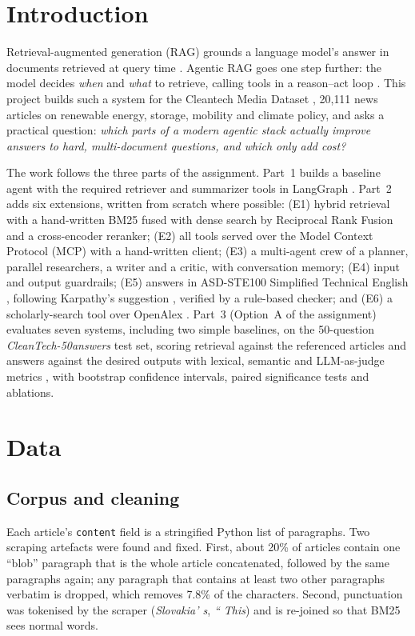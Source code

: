 \section{Introduction}
Retrieval-augmented generation (RAG) grounds a language model's answer in documents retrieved at query time
\cite{lewis2020rag}. Agentic RAG goes one step further: the model decides \emph{when} and \emph{what} to
retrieve, calling tools in a reason--act loop \cite{yao2023react}. This project builds such a system for the
Cleantech Media Dataset \cite{lipenkova2024cleantech}, 20{,}111 news articles on renewable energy,
storage, mobility and climate policy, and asks a practical question: \emph{which parts of a modern agentic
stack actually improve answers to hard, multi-document questions, and which only add cost?}

The work follows the three parts of the assignment. Part~1 builds a baseline agent with the required
retriever and summarizer tools in LangGraph \cite{langgraph}. Part~2 adds six extensions, written from
scratch where possible: (E1) hybrid retrieval with a hand-written BM25 \cite{robertson2009bm25} fused with
dense search by Reciprocal Rank Fusion \cite{cormack2009rrf} and a cross-encoder reranker; (E2) all tools
served over the Model Context Protocol (MCP) \cite{anthropic2024mcp} with a hand-written client; (E3) a
multi-agent crew of a planner, parallel researchers, a writer and a critic, with conversation memory;
(E4) input and output guardrails; (E5) answers in ASD-STE100 Simplified Technical English
\cite{asdste100}, following Karpathy's suggestion \cite{nikhil2026karpathy}, verified by a rule-based checker;
and (E6) a scholarly-search tool over OpenAlex \cite{priem2022openalex}. Part~3 (Option~A of the assignment) evaluates seven systems, including two simple baselines, on
the 50-question \emph{CleanTech-50answers} test set, scoring retrieval against the referenced articles and
answers against the desired outputs with lexical, semantic and LLM-as-judge metrics
\cite{zheng2023judge}, with bootstrap confidence intervals, paired significance tests and ablations.

\section{Data}
\subsection{Corpus and cleaning}
Each article's \texttt{content} field is a stringified Python list of paragraphs. Two scraping artefacts were
found and fixed. First, about 20\% of articles contain one ``blob'' paragraph that is the whole article
concatenated, followed by the same paragraphs again; any paragraph that contains at least two other
paragraphs verbatim is dropped, which removes 7.8\% of the characters. Second, punctuation was tokenised by
the scraper (\textit{Slovakia' s}, \textit{`` This}) and is re-joined so that BM25 sees normal words.

